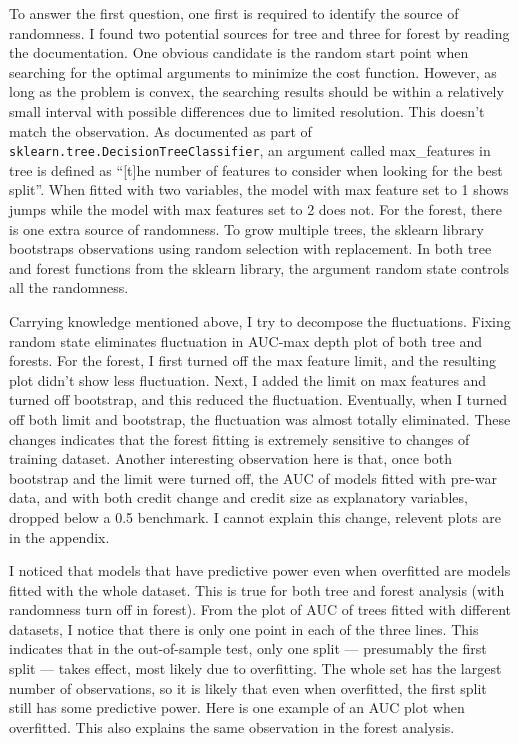 \documentclass{article}
\begin{document}
To answer the first question, one first is required to identify the source of
randomness. I found two potential sources for tree and three for
forest by reading the documentation. One obvious candidate is the random start point when searching
for the optimal arguments to minimize the cost function. However, as long as
the problem is convex, the searching results should be within a
relatively small interval with possible differences due to limited resolution. This
doesn't match the observation. As documented as part of \texttt{sklearn.tree.DecisionTreeClassifier}, an argument
called max\_features in tree is defined as ``{[}t{]}he number of features to consider when
looking for the best split''. When fitted with two variables, the model with max
feature set to 1 shows jumps while the model with max features set to 2 does not. For the forest, there is one extra
source of randomness. To grow multiple trees, the sklearn library
bootstraps observations using random selection with replacement. In both tree
and forest functions from the sklearn library, the argument random state controls all the
randomness.

Carrying knowledge mentioned above, I try to decompose the fluctuations.
Fixing random state eliminates fluctuation in
AUC-max depth plot of both tree and forests. For the forest, I first turned off the max
feature limit, and the resulting plot didn't show less fluctuation.
Next, I added the limit on max features and turned off bootstrap, and
this reduced the fluctuation. Eventually, when I turned off both limit
and bootstrap, the fluctuation was almost totally eliminated. These
changes indicates that the
forest fitting is extremely sensitive to changes of training dataset.
Another interesting observation here is that, once both bootstrap and the limit
were turned off, the AUC of models fitted with pre-war data, and with both
credit change and credit size as explanatory variables, dropped below a 0.5
benchmark. I cannot explain this change, relevent plots are in the appendix.

I noticed that models that have
predictive power even when overfitted are models fitted with the whole
dataset. This is true for both tree and forest analysis (with
randomness turn off in forest). From the plot of AUC of trees fitted
with different datasets, I notice that there is only one point in each
of the three lines. This indicates that in the out-of-sample test, only
one split --- presumably the first split --- takes effect, most likely due to
overfitting. The whole set has the largest number of observations, so it is likely that
even when overfitted, the first split still has some predictive power. Here
is one example of an AUC plot when overfitted. This also explains the same
observation in the forest analysis.
\end{document}
